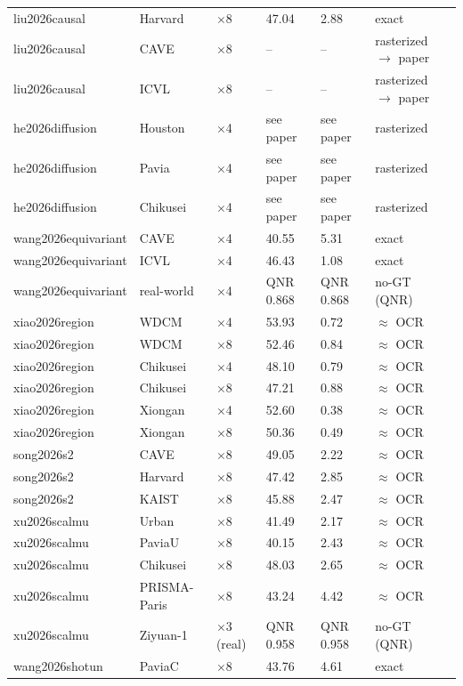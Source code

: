 \documentclass[11pt]{article}
\begin{document}
\begin{longtable}{@{}p{2.6cm}p{2.6cm}p{1.6cm}p{2.0cm}p{1.9cm}p{3.1cm}@{}}
liu2026causal & Harvard & $\times$8 & 47.04 & 2.88 & exact \\
liu2026causal & CAVE & $\times$8 & -- & -- & rasterized $\to$ paper \\
liu2026causal & ICVL & $\times$8 & -- & -- & rasterized $\to$ paper \\
he2026diffusion & Houston & $\times$4 & see paper & see paper & rasterized \\
he2026diffusion & Pavia & $\times$4 & see paper & see paper & rasterized \\
he2026diffusion & Chikusei & $\times$4 & see paper & see paper & rasterized \\
wang2026equivariant & CAVE & $\times$4 & 40.55 & 5.31 & exact \\
wang2026equivariant & ICVL & $\times$4 & 46.43 & 1.08 & exact \\
wang2026equivariant & real-world & $\times$4 & QNR 0.868 & QNR 0.868 & no-GT (QNR) \\
xiao2026region & WDCM & $\times$4 & 53.93 & 0.72 & $\approx$ OCR \\
xiao2026region & WDCM & $\times$8 & 52.46 & 0.84 & $\approx$ OCR \\
xiao2026region & Chikusei & $\times$4 & 48.10 & 0.79 & $\approx$ OCR \\
xiao2026region & Chikusei & $\times$8 & 47.21 & 0.88 & $\approx$ OCR \\
xiao2026region & Xiongan & $\times$4 & 52.60 & 0.38 & $\approx$ OCR \\
xiao2026region & Xiongan & $\times$8 & 50.36 & 0.49 & $\approx$ OCR \\
song2026s2 & CAVE & $\times$8 & 49.05 & 2.22 & $\approx$ OCR \\
song2026s2 & Harvard & $\times$8 & 47.42 & 2.85 & $\approx$ OCR \\
song2026s2 & KAIST & $\times$8 & 45.88 & 2.47 & $\approx$ OCR \\
xu2026scalmu & Urban & $\times$8 & 41.49 & 2.17 & $\approx$ OCR \\
xu2026scalmu & PaviaU & $\times$8 & 40.15 & 2.43 & $\approx$ OCR \\
xu2026scalmu & Chikusei & $\times$8 & 48.03 & 2.65 & $\approx$ OCR \\
xu2026scalmu & PRISMA-Paris & $\times$8 & 43.24 & 4.42 & $\approx$ OCR \\
xu2026scalmu & Ziyuan-1 & $\times$3 (real) & QNR 0.958 & QNR 0.958 & no-GT (QNR) \\
wang2026shotun & PaviaC & $\times$8 & 43.76 & 4.61 & exact \\

\end{longtable}
\end{document}
